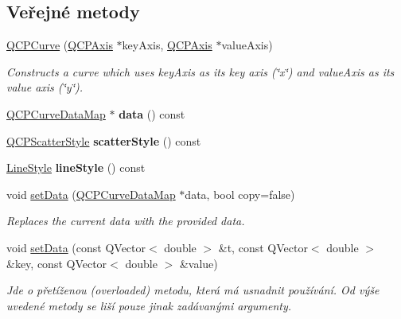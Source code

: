 \subsection*{Veřejné metody}
\begin{DoxyCompactItemize}
\item 
\hyperlink{classQCPCurve_a36de58e2652b3fa47bdf9187d421d3ce}{Q\+C\+P\+Curve} (\hyperlink{classQCPAxis}{Q\+C\+P\+Axis} $\ast$key\+Axis, \hyperlink{classQCPAxis}{Q\+C\+P\+Axis} $\ast$value\+Axis)
\begin{DoxyCompactList}\small\item\em Constructs a curve which uses {\itshape key\+Axis} as its key axis (\char`\"{}x\char`\"{}) and {\itshape value\+Axis} as its value axis (\char`\"{}y\char`\"{}). \end{DoxyCompactList}\item 
\hypertarget{classQCPCurve_a9ac194d35d4f334923aac9df1bf599ca}{}\hyperlink{qcustomplot_8h_a444d37ec9cb2951b3a7fe443c34d1658}{Q\+C\+P\+Curve\+Data\+Map} $\ast$ {\bfseries data} () const \label{classQCPCurve_a9ac194d35d4f334923aac9df1bf599ca}

\item 
\hypertarget{classQCPCurve_a9ab864c9f6ba0cedf65853f59d867a68}{}\hyperlink{classQCPScatterStyle}{Q\+C\+P\+Scatter\+Style} {\bfseries scatter\+Style} () const \label{classQCPCurve_a9ab864c9f6ba0cedf65853f59d867a68}

\item 
\hypertarget{classQCPCurve_a0314dd644258949aeb4a95cebde5abaf}{}\hyperlink{classQCPCurve_a2710e9f79302152cff794c6e16cc01f1}{Line\+Style} {\bfseries line\+Style} () const \label{classQCPCurve_a0314dd644258949aeb4a95cebde5abaf}

\item 
void \hyperlink{classQCPCurve_a631ac886708460013b30052f49cbc9da}{set\+Data} (\hyperlink{qcustomplot_8h_a444d37ec9cb2951b3a7fe443c34d1658}{Q\+C\+P\+Curve\+Data\+Map} $\ast$data, bool copy=false)
\begin{DoxyCompactList}\small\item\em Replaces the current data with the provided {\itshape data}. \end{DoxyCompactList}\item 
void \hyperlink{classQCPCurve_affe80e011e2ced62a88f614acd6ab8d1}{set\+Data} (const Q\+Vector$<$ double $>$ \&t, const Q\+Vector$<$ double $>$ \&key, const Q\+Vector$<$ double $>$ \&value)
\begin{DoxyCompactList}\small\item\em Jde o přetíženou (overloaded) metodu, která má usnadnit používání. Od výše uvedené metody se liší pouze jinak zadávanými argumenty.


\end{DoxyCompactList}
\end{DoxyCompactItemize}
